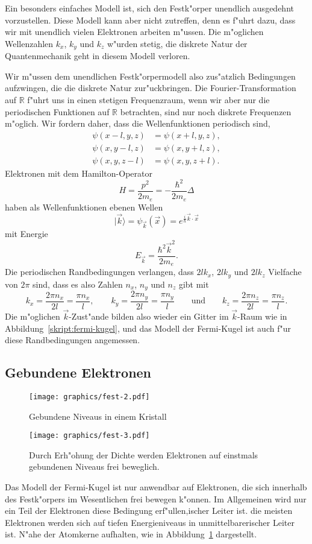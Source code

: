Ein besonders einfaches Modell ist, sich den Festk"orper unendlich 
ausgedehnt vorzustellen. Diese Modell kann aber nicht zutreffen, denn
es f"uhrt dazu, dass wir mit unendlich vielen Elektronen arbeiten m"ussen.
Die m"oglichen Wellenzahlen $k_x$, $k_y$ und $k_z$ w"urden stetig, die
diskrete Natur der Quantenmechanik geht in diesem Modell verloren.

Wir m"ussen dem unendlichen Festk"orpermodell also zus"atzlich Bedingungen
aufzwingen, die die diskrete Natur zur"uckbringen. Die Fourier-Transformation
auf $\mathbb R$ f"uhrt uns in einen stetigen Frequenzraum, wenn wir
aber nur die periodischen Funktionen auf $\mathbb R$ betrachten, sind
nur noch diskrete Frequenzen m"oglich.
Wir fordern daher, dass die Wellenfunktionen periodisch sind,
\begin{align*}
\psi(x-l, y  ,z  )&=\psi(x+l,y  ,z  ),
\\
\psi(x  , y-l,z  )&=\psi(x  ,y+l,z  ),
\\
\psi(x  , y  ,z-l)&=\psi(x  ,y  ,z+l).
\end{align*}
Elektronen mit dem Hamilton-Operator 
\[
H=\frac{p^2}{2m_e}=-\frac{\hbar^2}{2m_e}\Delta
\]
haben als Wellenfunktionen ebenen Wellen
\[
|\vec k\rangle
=
\psi_{\vec k}(\vec x)
=
e^{\frac{i}{\hbar}\vec k\cdot \vec x}
\]
mit Energie
\[
E_{\vec k}=\frac{\hbar^2\vec k^2}{2m_e}.
\]
Die periodischen Randbedingungen verlangen, dass $2l k_x$, $2lk_y$ und $2lk_z$
Vielfache von $2\pi$ sind, dass es also Zahlen $n_x$, $n_y$ und $n_z$ gibt mit
\[
k_x=\frac{2\pi n_x}{2l}=\frac{\pi n_x}{l},\qquad
k_y=\frac{2\pi n_y}{2l}=\frac{\pi n_y}{l}\qquad\text{und}\qquad
k_z=\frac{2\pi n_z}{2l}=\frac{\pi n_z}{l}.
\]
Die m"oglichen $\vec k$-Zust"ande bilden also wieder ein Gitter im
$\vec k$-Raum wie in Abbildung~\ref{skript:fermi-kugel}, und das Modell
der Fermi-Kugel ist auch f"ur diese Randbedingungen angemessen.

\subsection{Gebundene Elektronen\label{skript:gebundeneelektronen}}
\begin{figure}
\centering
\texttt{[image: graphics/fest-2.pdf]}
\caption{Gebundene Niveaus in einem Kristall
\label{skript:gebundene-niveaus}}
\end{figure}
\begin{figure}
\centering
\texttt{[image: graphics/fest-3.pdf]}
\caption{Durch Erh"ohung der Dichte werden Elektronen auf einstmals
gebundenen Niveaus frei beweglich.
\label{skript:gebundene-niveaus-komprimiert}}
\end{figure}
Das Modell der Fermi-Kugel ist nur anwendbar auf Elektronen, die sich
innerhalb des Festk"orpers im Wesentlichen frei bewegen k"onnen.
Im Allgemeinen wird nur ein Teil der Elektronen diese Bedingung erf"ullen,ischer Leiter ist.
die meisten Elektronen werden sich auf tiefen Energieniveaus in unmittelbarerischer Leiter ist.
N"ahe der Atomkerne aufhalten, wie in Abbildung~\ref{skript:gebundene-niveaus}
dargestellt.

